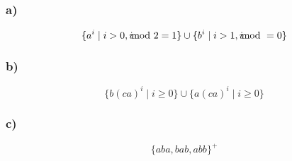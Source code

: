 \documentclass{article}
\begin{document}
   \subsection{} 
   
   \subsubsection{a)}
   
   \begin{equation*}
      \{a^i \mid i > 0, i \kern-8pt\mod 2 = 1\} \cup \{b^i \mid i > 1, i
      \kern-8pt\mod = 0\}
   \end{equation*}

   \subsubsection{b)}

   \begin{equation*}
      \{b(ca)^i \mid i \ge 0\} \cup \{a(ca)^i \mid i \ge 0\}
   \end{equation*}

   \subsubsection{c)}

   \begin{equation*}
      \{aba, bab, abb\}^+
   \end{equation*}

   \subsection{} 
   
   \begin{center}
   \end{center}

   \subsection{} 
   
\end{document}

